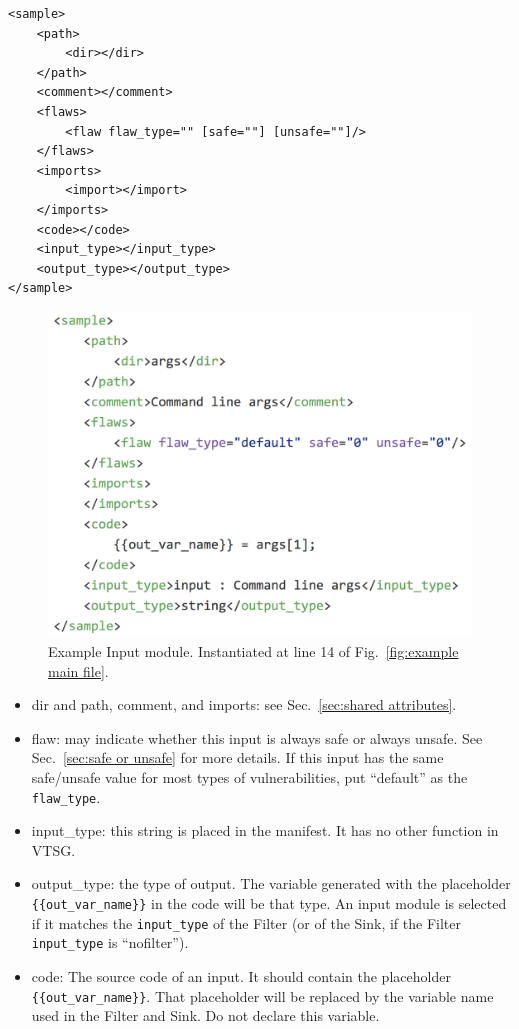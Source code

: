 \begin{verbatim}
<sample>
    <path>
        <dir></dir>
    </path>
    <comment></comment>
    <flaws>
        <flaw flaw_type="" [safe=""] [unsafe=""]/>
    </flaws>
    <imports>
        <import></import>
    </imports>
    <code></code>
    <input_type></input_type>
    <output_type></output_type>
</sample>
\end{verbatim}

\begin{figure}[tbp]
  \includegraphics{fig_Input_file.png}
  \caption{Example Input module.  Instantiated at line 14 of 
  Fig.~\ref{fig:example main file}.}
  \label{fig:example input file}
\end{figure}

\begin{itemize}
    \item dir and path, comment, and imports: see Sec.~\ref{sec:shared attributes}.

    \item flaw: may indicate whether this input is always safe or always unsafe.
      See Sec.~\ref{sec:safe or unsafe} for
      more details.  If this input has the same safe/unsafe value for most
      types of vulnerabilities, put ``default'' as the \verb|flaw_type|.

    \item input\_type: this string is placed in the manifest.  It has no other
      function in VTSG.

    \item output\_type: the type of output.  The variable generated with the
      placeholder \\ \verb|{{out_var_name}}| in the code will be that type.
      An input module is selected if it matches the \verb|input_type| of the Filter
      (or of the Sink, if the Filter \verb|input_type| is ``nofilter'').

    \item code: The source code of an input. It should contain the placeholder \\
      \verb|{{out_var_name}}|.  That placeholder will be replaced by the variable
      name used in the Filter and Sink.  Do not declare this variable.
\end{itemize}

